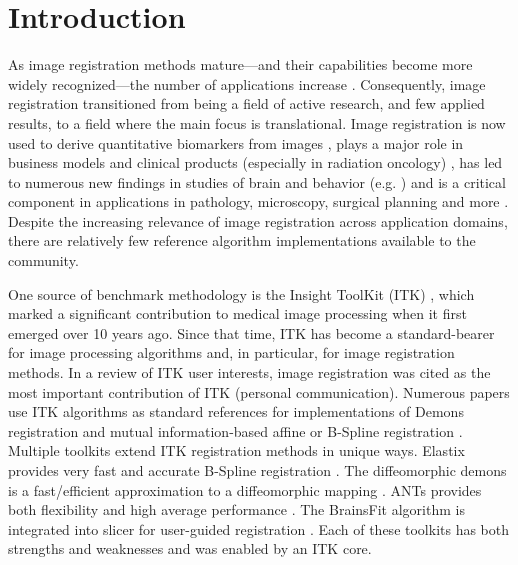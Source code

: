 \documentclass{frontiersSCNS}
\begin{document}
\section{Introduction}
As image registration methods mature---and their capabilities become
more widely recognized---the number of applications increase
\cite{Rueckert1999,2004,Shelton2005,Miller2005,Chen2008,Cheung2009,Baloch2009,Peyrat2010,Metz2011,Kikinis2011,Fedorov2011,Murphy2011}.
Consequently, image registration transitioned from being a field of active research, and few applied results, to a
field where the main focus is translational.  Image registration is
now used to derive quantitative biomarkers from images
\cite{Jack2010a}, plays a major role in business models and clinical
products (especially in radiation oncology) \cite{Cheung2009}, has led
to numerous new findings in studies of brain and behavior (e.g. \cite{Bearden2007}) and is a critical component in applications in
pathology, microscopy, surgical planning and more
\cite{Shelton2005,Miller2005,Floca2007,Chen2008,Cheung2009,Peyrat2010,Kikinis2011,Murphy2011}.
Despite the increasing relevance of image registration across
application domains, there are relatively few reference algorithm
implementations available to the community.






One source of benchmark methodology is the Insight ToolKit (ITK)
\cite{Yoo2002,Ackerman2003}, which marked a significant contribution to
medical image processing when it first emerged over 10 years ago.
Since that time, ITK has become a standard-bearer for image
processing algorithms and, in particular, for image registration
methods.  In a review of ITK user interests, image registration was cited as the most important
contribution of ITK (personal communication).  Numerous papers use ITK
algorithms as standard references for implementations of Demons
registration and mutual information-based affine or B-Spline
registration \cite{2004,Shelton2005,Floca2007,Chen2008,Cheung2009}.
Multiple toolkits extend ITK registration methods in unique ways.
Elastix provides very fast and accurate B-Spline registration
\cite{Klein2010,Murphy2011}.  The diffeomorphic demons is a fast/efficient
approximation to a diffeomorphic mapping \cite{Vercauteren2009}.  
ANTs provides both flexibility and high average performance
\cite{Avants2011}.  The BrainsFit algorithm is integrated into slicer
for user-guided registration \cite{Kikinis2011}.
Each of these toolkits has both strengths and weaknesses
\cite{Klein2010,Murphy2011} and was enabled by an ITK core.    
\end{document}
